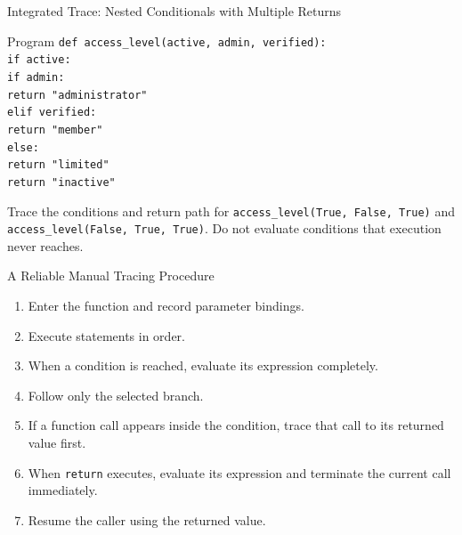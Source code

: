 \documentclass[aspectratio=169,10pt]{beamer}
\begin{document}
\begin{frame}[shrink=4]{Integrated Trace: Nested Conditionals with Multiple Returns}
  \begin{block}{Program}
    \texttt{def access\_level(active, admin, verified):}\\
    \hspace*{0.20in}\texttt{if active:}\\
    \hspace*{0.40in}\texttt{if admin:}\\
    \hspace*{0.60in}\texttt{return "administrator"}\\
    \hspace*{0.40in}\texttt{elif verified:}\\
    \hspace*{0.60in}\texttt{return "member"}\\
    \hspace*{0.40in}\texttt{else:}\\
    \hspace*{0.60in}\texttt{return "limited"}\\
    \hspace*{0.20in}\texttt{return "inactive"}
  \end{block}

  \begin{activity}
    Trace the conditions and return path for \texttt{access\_level(True, False, True)} and \texttt{access\_level(False, True, True)}. Do not evaluate conditions that execution never reaches.
  \end{activity}
\end{frame}

\begin{frame}{A Reliable Manual Tracing Procedure}
  \begin{enumerate}
    \item Enter the function and record parameter bindings.
    \item Execute statements in order.
    \item When a condition is reached, evaluate its expression completely.
    \item Follow only the selected branch.
    \item If a function call appears inside the condition, trace that call to its returned value first.
    \item When \texttt{return} executes, evaluate its expression and terminate the current call immediately.
    \item Resume the caller using the returned value.
  \end{enumerate}
\end{frame}
\end{document}

